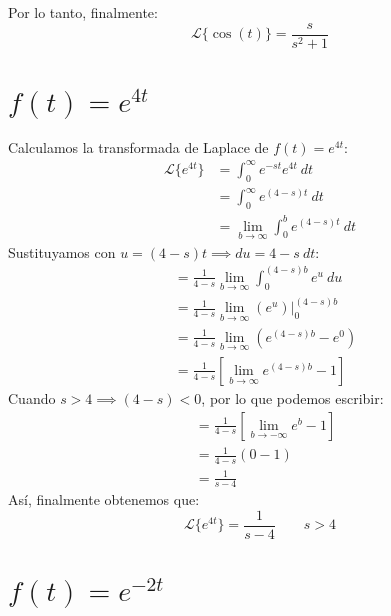 \documentclass[12pt, a4paper]{article}
\begin{document}
Por lo tanto, finalmente:
\[
	\mathcal{L}\{\cos (t)\} = \frac{s}{s ^{2} + 1}
\]


\setcounter{section}{10}
\section{\texorpdfstring{\(f(t)=e^{4t}\)}{f (t) = e (4t) }}

Calculamos la transformada de Laplace de \(f(t) = e^{4t}\):
\begin{align*}
	\mathcal{L}\{e^{4t}\} &= \int_{0}^{\infty} e^{-st} e^{4t}\ dt \\
	&= \int_{0}^{\infty} e^{(4-s)t} \ dt \\
	&= \lim_{b \to \infty} \int_{0}^{b} e^{(4-s)t} \ dt
\end{align*}
Sustituyamos con \(u = (4-s) t \implies du = 4-s\ dt\):
\begin{align*}
	&= \frac{1}{4-s} \lim_{b \to \infty} \int_{0}^{(4-s)b} e^{u} \ du \\
	&= \frac{1}{4-s} \lim_{b \to \infty} \left. \left( e^{u} \right)  \right|_{0}^{(4-s)b} \\
	&= \frac{1}{4-s} \lim_{b \to \infty} \left( e^{(4-s)b} - e^{0} \right) \\
	&= \frac{1}{4-s} \left[ \lim_{b \to \infty} e^{(4-s)b} - 1 \right]
\end{align*}
Cuando \(s > 4 \implies (4-s) < 0\), por lo que podemos escribir:
\begin{align*}
	&= \frac{1}{4-s} \left[ \lim_{b \to -\infty} e^{b} - 1 \right] \\
	&= \frac{1}{4-s} (0 - 1) \\
	&= \frac{1}{s-4}
\end{align*}
Así, finalmente obtenemos que:
\[
	\mathcal{L}\{e^{4t}\} = \frac{1}{s-4} \qquad s > 4
\]

\section{\texorpdfstring{\(f(t)=e^{-2t}\)}{f (t) = e (-2t)}}
\end{document}
